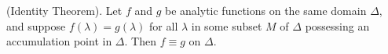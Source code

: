 (Identity Theorem). Let $f$ and $g$ be analytic functions on the same domain $\Delta$, and suppose $f(\lambda) = g(\lambda)$ for all $\lambda$ in some subset $M$ of $\Delta$ possessing an accumulation point in $\Delta$. Then $f \equiv g$ on $\Delta$.
